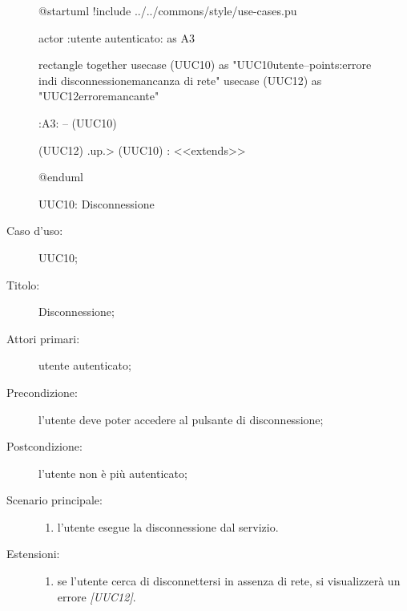 \documentclass[../../../analisi-dei-requisiti.tex]{subfiles}
\begin{document}
\begin{figure}[H]
  \centering
  \begin{plantuml}
  @startuml
  !include ../../commons/style/use-cases.pu

  actor :utente autenticato: as A3

  rectangle {
    together {
      usecase (UUC10) as "UUC10\nDisconnessione utente\n--\nExtension points:\nVisualizzazione errore in\ncaso di disconnessione\nin mancanza di rete"
      usecase (UUC12) as "UUC12\nVisualizzazione errore\nrete mancante"
    }
  }

  :A3: -- (UUC10)

  (UUC12) .up.> (UUC10) : <<extends>>

  @enduml
  \end{plantuml}
  \caption{UUC10: Disconnessione}%
  \label{fig:UUC10}
\end{figure}

  \begin{description}
  \item[Caso d’uso:] UUC10;
  \item[Titolo:] Disconnessione;
  \item[Attori primari:] utente autenticato;
  \item[Precondizione:] l'utente deve poter accedere al pulsante di disconnessione;
  \item[Postcondizione:] l'utente non è più autenticato;
  \item[Scenario principale:]
        \begin{enumerate}
          \item l'utente esegue la disconnessione dal servizio.
        \end{enumerate}
  \item[Estensioni:]
        \begin{enumerate}
          \item se l'utente cerca di disconnettersi in assenza di rete, si visualizzerà un errore \emph{[UUC12]}.
        \end{enumerate}
\end{description}
\end{document}
